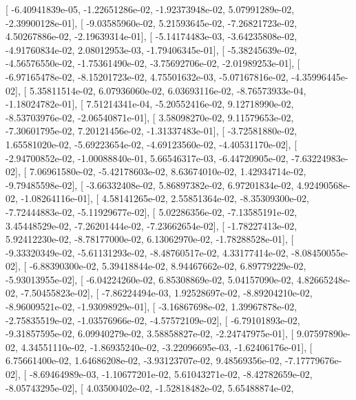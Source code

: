 \documentclass{article}
\begin{document}
       [ -6.40941839e-05,  -1.22651286e-02,  -1.92373948e-02,
          5.07991289e-02,  -2.39900128e-01],
       [ -9.03585960e-02,   5.21593645e-02,  -7.26821723e-02,
          4.50267886e-02,  -2.19639314e-01],
       [ -5.14174483e-03,  -3.64235808e-02,  -4.91760834e-02,
          2.08012953e-03,  -1.79406345e-01],
       [ -5.38245639e-02,  -4.56576550e-02,  -1.75361490e-02,
         -3.75692706e-02,  -2.01989253e-01],
       [ -6.97165478e-02,  -8.15201723e-02,   4.75501632e-03,
         -5.07167816e-02,  -4.35996445e-02],
       [  5.35811514e-02,   6.07936060e-02,   6.03693116e-02,
         -8.76573933e-04,  -1.18024782e-01],
       [  7.51214341e-04,  -5.20552416e-02,   9.12718990e-02,
         -8.53703976e-02,  -2.06540871e-01],
       [  3.58098270e-02,   9.11579653e-02,  -7.30601795e-02,
          7.20121456e-02,  -1.31337483e-01],
       [ -3.72581880e-02,   1.65581020e-02,  -5.69223654e-02,
         -4.69123560e-02,  -4.40531170e-02],
       [ -2.94700852e-02,  -1.00088840e-01,   5.66546317e-03,
         -6.44720905e-02,  -7.63224983e-02],
       [  7.06961580e-02,  -5.42178603e-02,   8.63674010e-02,
          1.42934714e-02,  -9.79485598e-02],
       [ -3.66332408e-02,   5.86897382e-02,   6.97201834e-02,
          4.92490568e-02,  -1.08264116e-01],
       [  4.58141265e-02,   2.55851364e-02,  -8.35309300e-02,
         -7.72444883e-02,  -5.11929677e-02],
       [  5.02286356e-02,  -7.13585191e-02,   3.45448529e-02,
         -7.26201444e-02,  -7.23662654e-02],
       [ -1.78227413e-02,   5.92412230e-02,  -8.78177000e-02,
          6.13062970e-02,  -1.78288528e-01],
       [ -9.33320349e-02,  -5.61131293e-02,  -8.48760517e-02,
          4.33177414e-02,  -8.08450055e-02],
       [ -6.88390300e-02,   5.39418844e-02,   8.94467662e-02,
          6.89779229e-02,  -5.93013955e-02],
       [ -6.04224260e-02,   6.85308869e-02,   5.04157090e-02,
          4.82665248e-02,  -7.50455823e-02],
       [ -7.86224494e-03,   1.92528697e-02,  -8.89204210e-02,
         -8.96009521e-02,  -1.93098929e-01],
       [ -3.16867698e-02,   1.39967878e-02,  -2.75835519e-02,
         -1.03576966e-02,  -4.57572109e-02],
       [ -6.79101893e-02,  -9.31857595e-02,   6.09940279e-02,
          3.58858827e-02,  -2.24747975e-01],
       [  9.07597890e-02,   4.34551110e-02,  -1.86935240e-02,
         -3.22096695e-03,  -1.62406176e-01],
       [  6.75661400e-02,   1.64686208e-02,  -3.93123707e-02,
          9.48569356e-02,  -7.17779676e-02],
       [ -8.69464989e-03,  -1.10677201e-02,   5.61043271e-02,
         -8.42782659e-02,  -8.05743295e-02],
       [  4.03500402e-02,  -1.52818482e-02,   5.65488874e-02,
\end{document}
